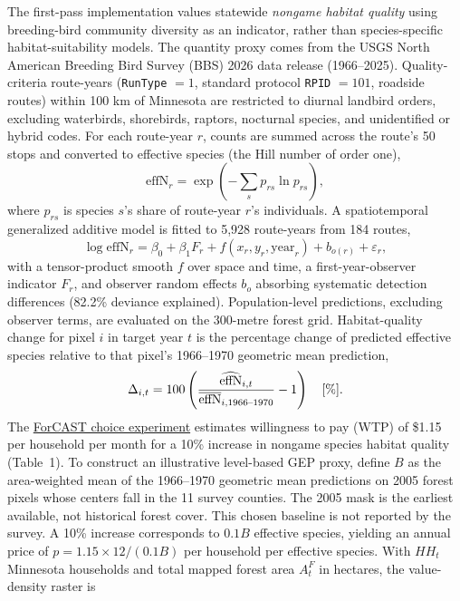 \documentclass[11pt]{article}
\begin{document}
The first-pass implementation values statewide \emph{nongame habitat quality} using breeding-bird community diversity as an indicator, rather than species-specific habitat-suitability models. The quantity proxy comes from the USGS North American Breeding Bird Survey (BBS) 2026 data release (1966--2025). Quality-criteria route-years (\texttt{RunType} $=1$, standard protocol \texttt{RPID} $=101$, roadside routes) within 100 km of Minnesota are restricted to diurnal landbird orders, excluding waterbirds, shorebirds, raptors, nocturnal species, and unidentified or hybrid codes. For each route-year $r$, counts are summed across the route's 50 stops and converted to effective species (the Hill number of order one),
\begin{equation}
\mathrm{effN}_r=\exp\!\left(-\sum_s p_{rs}\ln p_{rs}\right),
\label{eq:effective-species}
\end{equation}
where $p_{rs}$ is species $s$'s share of route-year $r$'s individuals. A spatiotemporal generalized additive model is fitted to 5,928 route-years from 184 routes,
\begin{equation}
\log \mathrm{effN}_r=\beta_0+\beta_1 F_r+f(x_r,y_r,\mathrm{year}_r)+b_{o(r)}+\varepsilon_r,
\label{eq:diversity-gam}
\end{equation}
with a tensor-product smooth $f$ over space and time, a first-year-observer indicator $F_r$, and observer random effects $b_o$ absorbing systematic detection differences (82.2\% deviance explained). Population-level predictions, excluding observer terms, are evaluated on the 300-metre forest grid. Habitat-quality change for pixel $i$ in target year $t$ is the percentage change of predicted effective species relative to that pixel's 1966--1970 geometric mean prediction,
\begin{equation}
\Delta_{i,t}=100\left(\frac{\widehat{\mathrm{effN}}_{i,t}}{\overline{\mathrm{effN}}_{i,1966\mbox{\scriptsize --}1970}}-1\right)\quad [\%].
\label{eq:habitat-quality-change}
\end{equation}
The \href{https://mnforcast.org/ecosystem-valuation}{ForCAST choice experiment} estimates willingness to pay (WTP) of \$1.15 per household per month for a 10\% increase in nongame species habitat quality (Table~1). To construct an illustrative level-based GEP proxy, define $B$ as the area-weighted mean of the 1966--1970 geometric mean predictions on 2005 forest pixels whose centers fall in the 11 survey counties. The 2005 mask is the earliest available, not historical forest cover. This chosen baseline is not reported by the survey. A 10\% increase corresponds to $0.1B$ effective species, yielding an annual price of $p=1.15\times 12/(0.1B)$ per household per effective species. With $HH_t$ Minnesota households and total mapped forest area $A^F_t$ in hectares, the value-density raster is
\end{document}
